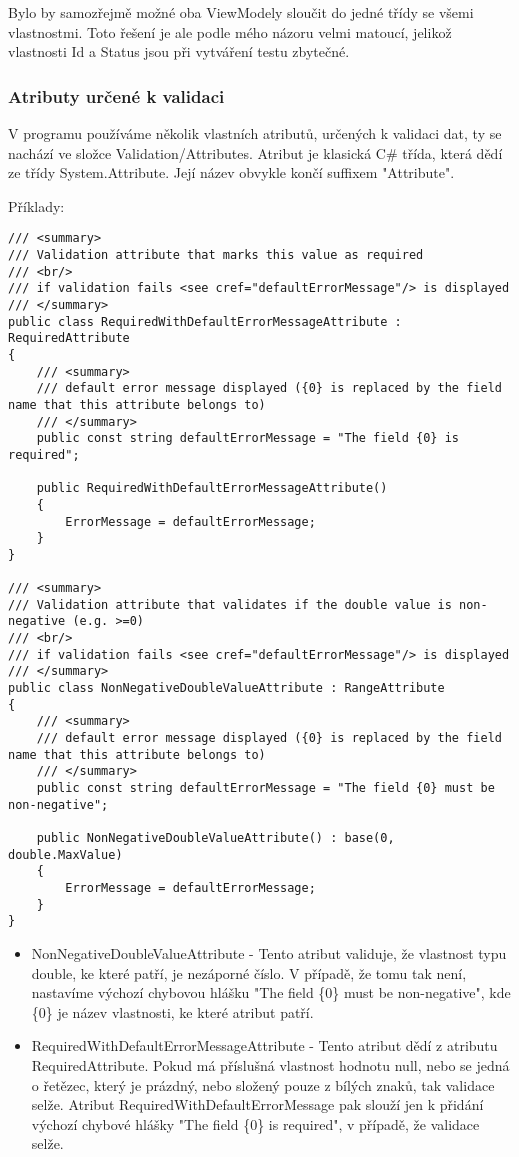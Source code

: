 Bylo by samozřejmě možné oba ViewModely sloučit do jedné třídy se všemi vlastnostmi. Toto řešení je ale podle mého názoru velmi matoucí, jelikož vlastnosti Id a Status jsou při vytváření testu zbytečné.

\subsubsection*{Atributy určené k validaci}

V programu používáme několik vlastních atributů, určených k validaci dat, ty se nachází ve složce Validation/Attributes.
Atribut je klasická C\# třída, která dědí ze třídy System.Attribute. Její název obvykle končí suffixem "Attribute".

Příklady:
\begin{lstlisting}
/// <summary>
/// Validation attribute that marks this value as required
/// <br/>
/// if validation fails <see cref="defaultErrorMessage"/> is displayed
/// </summary>
public class RequiredWithDefaultErrorMessageAttribute : RequiredAttribute
{
	/// <summary>
	/// default error message displayed ({0} is replaced by the field name that this attribute belongs to)
	/// </summary>
	public const string defaultErrorMessage = "The field {0} is required";
	
	public RequiredWithDefaultErrorMessageAttribute()
	{
		ErrorMessage = defaultErrorMessage;
	}
}

/// <summary>
/// Validation attribute that validates if the double value is non-negative (e.g. >=0)
/// <br/>
/// if validation fails <see cref="defaultErrorMessage"/> is displayed
/// </summary>
public class NonNegativeDoubleValueAttribute : RangeAttribute
{
	/// <summary>
	/// default error message displayed ({0} is replaced by the field name that this attribute belongs to)
	/// </summary>
	public const string defaultErrorMessage = "The field {0} must be non-negative";
	
	public NonNegativeDoubleValueAttribute() : base(0, double.MaxValue)
	{
		ErrorMessage = defaultErrorMessage;
	}
}
\end{lstlisting}

\begin{itemize}
\item NonNegativeDoubleValueAttribute - Tento atribut validuje, že vlastnost typu double, ke které patří, je nezáporné číslo. V případě, že tomu tak není, nastavíme výchozí chybovou hlášku "The field \{0\} must be non-negative", kde \{0\} je název vlastnosti, ke které atribut patří.

\item RequiredWithDefaultErrorMessageAttribute - Tento atribut dědí z atributu RequiredAttribute. Pokud má příslušná vlastnost hodnotu null, nebo se jedná o řetězec, který je prázdný, nebo složený pouze z bílých znaků, tak validace selže. Atribut RequiredWithDefaultErrorMessage pak slouží jen k přidání výchozí chybové hlášky "The field \{0\} is required", v případě, že validace selže.

\end{itemize}

